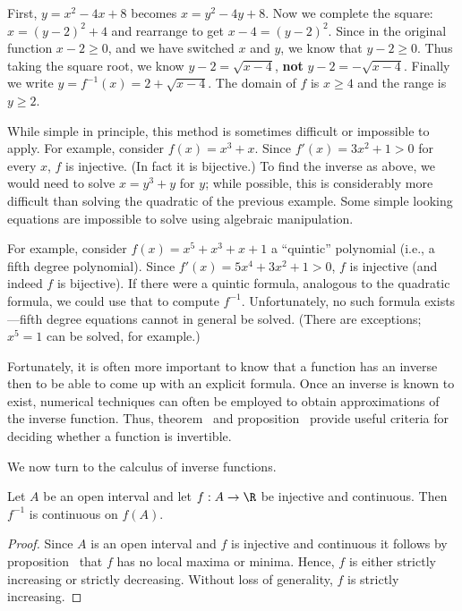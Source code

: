 \begin{theorem}
\begin{theorem}
\begin{theorem}
\begin{example}
First, $y =x^2 - 4x + 8$ becomes $x=y^2-4y+8$.
Now we complete the square: $x=(y-2)^2 +4$ and
rearrange to get $x-4=(y-2)^2$. Since in the original function
$x-2\ge 0$, and we have switched $x$ and $y$, we know that
$y-2\ge 0$. Thus taking the square root, we know
$y-2=\sqrt{x-4}$, {\bf not} $y-2=-\sqrt{x-4}$.
Finally we write $y=f^{-1}(x)=2+\sqrt{x-4}$.
The domain of $f$ is $x\geq 4$ and the range is $y\geq 2$. 

\end{example}

While simple in principle, this method is sometimes difficult or
impossible to apply. For example, consider
$f(x)=x^3 + x $. Since $f'(x) = 3x^2 +1 >0 $ for every $x$,
$f$ is injective. (In fact it is bijective.) To find the inverse as
above, we would need to solve $x=y^3+y$ for $y$; while possible, this
is considerably more difficult than solving the quadratic of the
previous example. Some simple looking equations are impossible to
solve using algebraic manipulation. 

For example,
consider $f(x) =x^5 + x^3 + x +1$ a ``quintic'' polynomial (i.e., a
fifth degree polynomial). Since
$f'(x)= 5x^4 + 3x^2 + 1>0$, $f$ is injective
(and indeed $f$ is bijective). If there were a
quintic formula, analogous to the quadratic formula,
we could use that to compute $f^{-1}$. Unfortunately, no
such formula exists---fifth degree equations cannot in general be
solved. (There are exceptions; $x^5=1$ can be solved, for example.)

Fortunately, it is often more important to know that a function has
an inverse then to be able to come up with an explicit formula. Once
an inverse is known to exist, numerical techniques can often be
employed to obtain approximations of the inverse function. Thus,
theorem~
and proposition~ provide useful
criteria for deciding whether a function is invertible.


We now turn to the calculus of inverse functions.

\begin{theorem} Let $A$ be an open interval and let $f:A\to \R$ be injective and
continuous. Then $f^{-1}$ is continuous on $f(A)$.  

\begin{proof} Since $A$ is an open interval and $f$ is injective and
continuous it follows by proposition~
that $f$ has no local maxima or minima. Hence, $f$ is either strictly
increasing or strictly decreasing. Without loss of generality, $f$ is
strictly increasing.


\end{proof}
\end{theorem}
\end{theorem}
\end{theorem}
\end{theorem}

